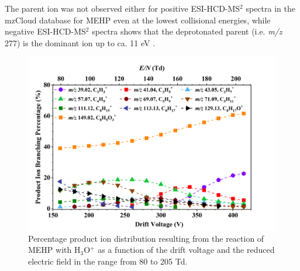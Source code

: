 The parent ion was not observed either for positive ESI-HCD-MS$^2$ spectra in the mzCloud database for MEHP even at the lowest collisional energies, while negative ESI-HCD-MS$^2$ spectra shows that the deprotonated parent (i.e. \textit{m/z} 277) is the dominant ion up to ca. 11 eV \cite{mzcloudMEHP}.
%










\begin{figure}[htb]%
\centering
\includegraphics[height=0.35\textheight]{pics/MEHP-BR.png}
\caption{Percentage product ion distribution resulting from the reaction of MEHP with H$_3$O$^+$ as a function of the drift voltage and the reduced electric field in the range from 80 to 205 Td.}
\label{fig:PH_MEHP_fs}
\end{figure}


